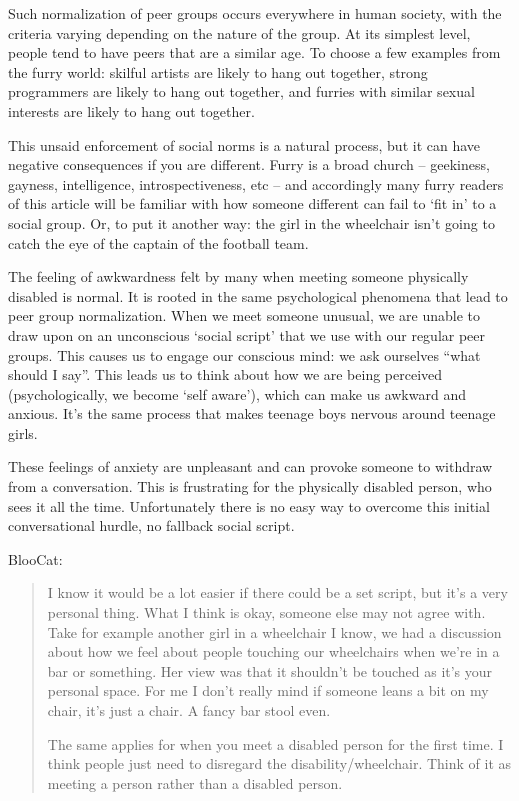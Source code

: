 Such normalization of peer groups occurs everywhere in human society, with the criteria varying depending on the nature of the group. At its simplest level, people tend to have peers that are a similar age. To choose a few examples from the furry world: skilful artists are likely to hang out together, strong programmers are likely to hang out together, and furries with similar sexual interests are likely to hang out together.

This unsaid enforcement of social norms is a natural process, but it can have negative consequences if you are different. Furry is a broad church -- geekiness, gayness, intelligence, introspectiveness, etc -- and accordingly many furry readers of this article will be familiar with how someone different can fail to `fit in' to a social group. Or, to put it another way: the girl in the wheelchair isn't going to catch the eye of the captain of the football team.

The feeling of awkwardness felt by many when meeting someone physically disabled is normal. It is rooted in the same psychological phenomena that lead to peer group normalization. When we meet someone unusual, we are unable to draw upon on an unconscious `social script' that we use with our regular peer groups. This causes us to engage our conscious mind: we ask ourselves ``what should I say''. This leads us to think about how we are being perceived (psychologically, we become `self aware'), which can make us awkward and anxious. It's the same process that makes teenage boys nervous around teenage girls.

These feelings of anxiety are unpleasant and can provoke someone to withdraw from a conversation. This is frustrating for the physically disabled person, who sees it all the time. Unfortunately there is no easy way to overcome this initial conversational hurdle, no fallback social script.

BlooCat:

\begin{quotation}
  I know it would be a lot easier if there could be a set script, but it's a very personal thing. What I think is okay, someone else may not agree with. Take for example another girl in a wheelchair I know, we had a discussion about how we feel about people touching our wheelchairs when we're in a bar or something. Her view was that it shouldn't be touched as it's your personal space. For me I don't really mind if someone leans a bit on my chair, it's just a chair. A fancy bar stool even.

  The same applies for when you meet a disabled person for the first time. I think people just need to disregard the disability/wheelchair. Think of it as meeting a person rather than a disabled person.
\end{quotation}
